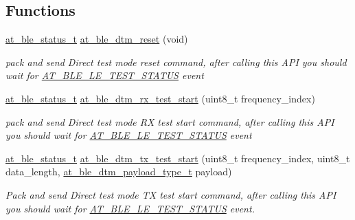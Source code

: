 \subsection*{Functions}
\begin{DoxyCompactItemize}
\item 
\mbox{\hyperlink{group__error__codes__group_ga3b1db9b95feb157b3c188ca27fe76988}{at\+\_\+ble\+\_\+status\+\_\+t}} \mbox{\hyperlink{group__dtm__group_ga820983d8c500e89b132467c02ea19340}{at\+\_\+ble\+\_\+dtm\+\_\+reset}} (void)
\begin{DoxyCompactList}\small\item\em pack and send Direct test mode reset command, after calling this A\+PI you should wait for \mbox{\hyperlink{at__ble__api_8h_a3324640b95f33169515f89738ed5baeba1dfeb2b9d9a9ceae264ac9eceae01f56}{A\+T\+\_\+\+B\+L\+E\+\_\+\+L\+E\+\_\+\+T\+E\+S\+T\+\_\+\+S\+T\+A\+T\+US}} event \end{DoxyCompactList}\item 
\mbox{\hyperlink{group__error__codes__group_ga3b1db9b95feb157b3c188ca27fe76988}{at\+\_\+ble\+\_\+status\+\_\+t}} \mbox{\hyperlink{group__dtm__group_ga37c9b74a351ddbed677bfb0b6b9396a9}{at\+\_\+ble\+\_\+dtm\+\_\+rx\+\_\+test\+\_\+start}} (uint8\+\_\+t frequency\+\_\+index)
\begin{DoxyCompactList}\small\item\em pack and send Direct test mode RX test start command, after calling this A\+PI you should wait for \mbox{\hyperlink{at__ble__api_8h_a3324640b95f33169515f89738ed5baeba1dfeb2b9d9a9ceae264ac9eceae01f56}{A\+T\+\_\+\+B\+L\+E\+\_\+\+L\+E\+\_\+\+T\+E\+S\+T\+\_\+\+S\+T\+A\+T\+US}} event \end{DoxyCompactList}\item 
\mbox{\hyperlink{group__error__codes__group_ga3b1db9b95feb157b3c188ca27fe76988}{at\+\_\+ble\+\_\+status\+\_\+t}} \mbox{\hyperlink{group__dtm__group_ga6d836e42fe4af24071a8d9191555bb85}{at\+\_\+ble\+\_\+dtm\+\_\+tx\+\_\+test\+\_\+start}} (uint8\+\_\+t frequency\+\_\+index, uint8\+\_\+t data\+\_\+length, \mbox{\hyperlink{group__dtm__group_ga08e5052da6ec260eb2778714b5ffdce8}{at\+\_\+ble\+\_\+dtm\+\_\+payload\+\_\+type\+\_\+t}} payload)
\begin{DoxyCompactList}\small\item\em Pack and send Direct test mode TX test start command, after calling this A\+PI you should wait for \mbox{\hyperlink{at__ble__api_8h_a3324640b95f33169515f89738ed5baeba1dfeb2b9d9a9ceae264ac9eceae01f56}{A\+T\+\_\+\+B\+L\+E\+\_\+\+L\+E\+\_\+\+T\+E\+S\+T\+\_\+\+S\+T\+A\+T\+US}} event. \end{DoxyCompactList}\item 

\end{DoxyCompactItemize}
